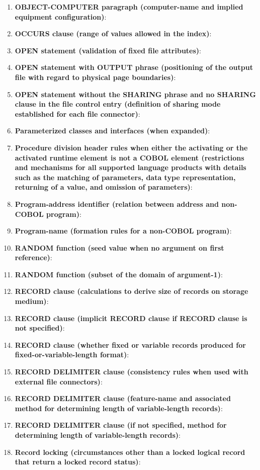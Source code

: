 \begin{enumerate}
\item \textbf{OBJECT-COMPUTER paragraph (computer-name and implied equipment configuration)}:
\item \textbf{OCCURS clause (range of values allowed in the index)}:
\item \textbf{OPEN statement (validation of fixed file attributes)}:
\item \textbf{OPEN statement with OUTPUT phrase (positioning of the output file with regard to physical page boundaries)}:
\item \textbf{OPEN statement without the SHARING phrase and no SHARING clause in the file control entry (definition of sharing mode established for each file connector)}:
\item \textbf{Parameterized classes and interfaces (when expanded)}:
\item \textbf{Procedure division header rules when either the activating or the activated runtime element is not a COBOL element (restrictions and mechanisms for all supported language products with details such as the matching of parameters, data type representation, returning of a value, and omission of parameters)}:
\item \textbf{Program-address identifier (relation between address and non-COBOL program)}:
\item \textbf{Program-name (formation rules for a non-COBOL program)}:
\item \textbf{RANDOM function (seed value when no argument on first reference)}:
\item \textbf{RANDOM function (subset of the domain of argument-1)}:
\item \textbf{RECORD clause (calculations to derive size of records on storage medium)}:
\item \textbf{RECORD clause (implicit RECORD clause if RECORD clause is not specified)}:
\item \textbf{RECORD clause (whether fixed or variable records produced for fixed-or-variable-length format)}:
\item \textbf{RECORD DELIMITER clause (consistency rules when used with external file connectors)}:
\item \textbf{RECORD DELIMITER clause (feature-name and associated method for determining length of variable-length records)}:
\item \textbf{RECORD DELIMITER clause (if not specified, method for determining length of variable-length records)}:
\item \textbf{Record locking (circumstances other than a locked logical record that return a locked record status)}:

\end{enumerate}
